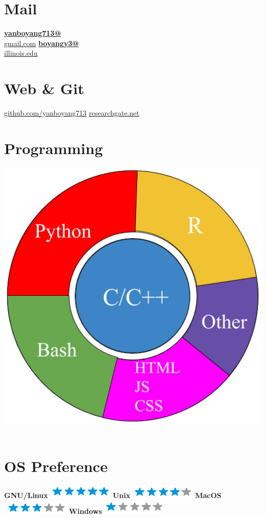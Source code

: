 \documentclass[]{friggeri-cv}
\begin{document}
\begin{aside}
  \section{Mail}
  \href{mailto:yanboyang713@gmail.com}{\textbf{yanboyang713@}\\gmail.com}
    \href{mailto:boyangy3@illinois.edu}{\textbf{boyangy3@}\\illinois.edu}
    ~
  \section{Web \& Git}
    \href{https://github.com/yanboyang713}{github.com/yanboyang713}
    \href{https://www.researchgate.net/profile/Boyang_Yan}{researchgate.net}
    ~
  \section{Programming}
    \includegraphics[scale=0.2]{img/programming.png}
    ~
  \section{OS Preference}
    \textbf{GNU/Linux}\includegraphics[scale=0.40]{img/5stars.png}
    \textbf{Unix}\includegraphics[scale=0.40]{img/4stars.png}
    \textbf{MacOS}\includegraphics[scale=0.40]{img/3stars.png}
    \textbf{Windows}\includegraphics[scale=0.40]{img/1stars.png}
    ~
\end{aside}
\end{document}
